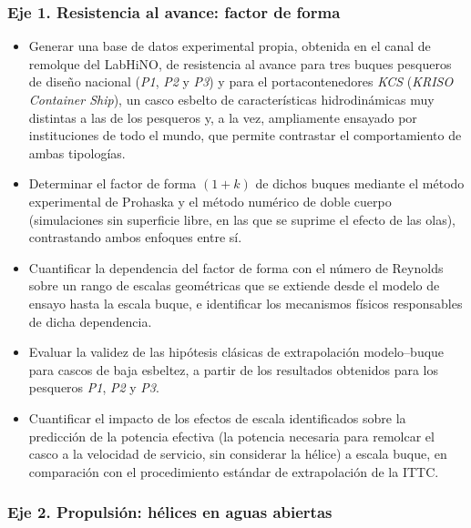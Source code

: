 \subsubsection*{Eje 1. Resistencia al avance: factor de forma}

\begin{itemize}
    \item Generar una base de datos experimental propia, obtenida en el canal
    de remolque del LabHiNO, de resistencia al avance para tres buques
    pesqueros de diseño nacional (\textit{P1}, \textit{P2} y \textit{P3}) y para el portacontenedores \textit{KCS}
    (\textit{KRISO Container Ship}), un casco esbelto de características
    hidrodinámicas muy distintas a las de los pesqueros y, a la vez,
    ampliamente ensayado por instituciones de todo el mundo, que permite
    contrastar el comportamiento de ambas tipologías.
    \item Determinar el factor de forma $(1+k)$ de dichos buques mediante el
    método experimental de Prohaska y el método numérico de doble cuerpo
    (simulaciones sin superficie libre, en las que se suprime el efecto de las
    olas), contrastando ambos enfoques entre sí.
    \item Cuantificar la dependencia del factor de forma con el número de
    Reynolds sobre un rango de escalas geométricas que se extiende desde el
    modelo de ensayo hasta la escala buque, e identificar los mecanismos
    físicos responsables de dicha dependencia.
    \item Evaluar la validez de las hipótesis clásicas de extrapolación
    modelo--buque para cascos de baja esbeltez, a partir de los resultados
    obtenidos para los pesqueros \textit{P1}, \textit{P2} y \textit{P3}.
    \item Cuantificar el impacto de los efectos de escala identificados sobre
    la predicción de la potencia efectiva (la potencia necesaria para remolcar
    el casco a la velocidad de servicio, sin considerar la hélice) a escala
    buque, en comparación con el procedimiento estándar de extrapolación de la
    ITTC.
\end{itemize}

\subsubsection*{Eje 2. Propulsión: hélices en aguas abiertas}

